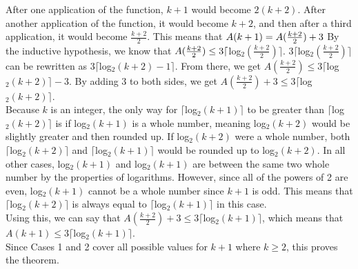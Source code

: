 \documentclass{article}
\begin{document}
After one application of the function, $k+1$ would become $2(k+2)$. After another application of the function, it would become $k+2$, and then after a third application, it would become $\frac{k+2}{2}$. This means that $A(k+1)=\\A(\frac{k+2}{2})+3$ By the inductive hypothesis, we know that $A(\frac{k+2}{2})\leq \\3\lceil $log$_2(\frac{k+2}{2})\rceil$. $3\lceil $log$_2(\frac{k+2}{2})\rceil$ can be rewritten as $3\lceil $log$_2(k+2)-1\rceil$. From there, we get $A(\frac{k+2}{2}) \leq 3\lceil $log$_2(k+2)\rceil-3$. By adding 3 to both sides, we get $A(\frac{k+2}{2})+3 \leq 3\lceil $log$_2(k+2)\rceil$.\\
\newline
Because $k$ is an integer, the only way for $\lceil $log$_2(k+1)\rceil$ to be greater than $\lceil $log$_2(k+2)\rceil$ is if log$_2(k+1)$ is a whole number, meaning log$_2(k+2)$ would be slightly greater and then rounded up. If log$_2(k+2)$ were a whole number, both $\lceil$log$_2(k+2)\rceil$ and $\lceil$log$_2(k+1)\rceil$ would be rounded up to log$_2(k+2)$. In all other cases, log$_2(k+1)$ and log$_2(k+1)$ are between the same two whole number by the properties of logarithms. However, since all of the powers of 2 are even, log$_2(k+1)$ cannot be a whole number since $k+1$ is odd. This means that $\lceil$log$_2(k+2)\rceil$ is always equal to $\lceil$log$_2(k+1)\rceil$ in this case.\\
\newline
Using this, we can say that $A(\frac{k+2}{2})+3 \leq 3\lceil $log$_2(k+1)\rceil$, which means that $A(k+1)\leq3\lceil $log$_2(k+1)\rceil$.\\
\newline
Since Cases 1 and 2 cover all possible values for $k+1$ where $k\geq2$, this proves the theorem.
\clearpage
\end{document}
